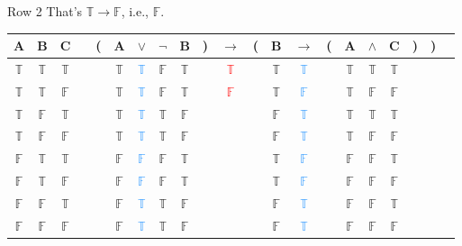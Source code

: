 \documentclass[
  ignorenonframetext,
]{beamer}
\renewcommand{\,}{\text{, }}
\def\True{\mathbb{T}}
\def\False{\mathbb{F}}
\begin{document}
\begin{frame}{Row 2}
\protect\hypertarget{row-2-1}{}
That's \(\True \rightarrow \False\), i.e., \(\False\).

\begin{center}

\begin{tabular}{@{ }c@{ }@{ }c@{ }@{ }c | c@{ }@{}c@{}@{ }c@{ }@{ }c@{ }@{ }c@{ }@{ }c@{ }@{}c@{}@{ }c@{ }@{}c@{}@{ }c@{ }@{ }c@{ }@{}c@{}@{ }c@{ }@{ }c@{ }@{ }c@{ }@{}c@{}@{}c@{}@{ }c}
A & B & C &  & ( & A & $\vee$ & $\neg$ & B & ) & $\rightarrow$ & ( & B & $\rightarrow$ & ( & A & $\wedge$ & C & ) & ) & \\
\hline 
 $\True$ & $\True$ & $\True$ &  &  & $\True$ & \textcolor{dodgerblue}{$\True$} & $\False$ & $\True$ &  &\textcolor{red}{$\True$}&  & $\True$ & \textcolor{dodgerblue}{$\True$} &  & $\True$ & $\True$ & $\True$ &  &  & \\
 $\True$ & $\True$ & $\False$ &  &  & $\True$ & \textcolor{dodgerblue}{$\True$} & $\False$ & $\True$ &  &\textcolor{red}{$\False$}&  & $\True$ & \textcolor{dodgerblue}{$\False$} &  & $\True$ & $\False$ & $\False$ &  &  & \\
 $\True$ & $\False$ & $\True$ &  &  & $\True$ & \textcolor{dodgerblue}{$\True$} & $\True$ & $\False$ &  &&  & $\False$ & \textcolor{dodgerblue}{$\True$} &  & $\True$ & $\True$ & $\True$ &  &  & \\
 $\True$ & $\False$ & $\False$ &  &  & $\True$ & \textcolor{dodgerblue}{$\True$} & $\True$ & $\False$ &  &&  & $\False$ & \textcolor{dodgerblue}{$\True$} &  & $\True$ & $\False$ & $\False$ &  &  & \\
 $\False$ & $\True$ & $\True$ &  &  & $\False$ & \textcolor{dodgerblue}{$\False$} & $\False$ & $\True$ &  &&  & $\True$ & \textcolor{dodgerblue}{$\False$} &  & $\False$ & $\False$ & $\True$ &  &  & \\
 $\False$ & $\True$ & $\False$ &  &  & $\False$ & \textcolor{dodgerblue}{$\False$} & $\False$ & $\True$ &  &&  & $\True$ & \textcolor{dodgerblue}{$\False$} &  & $\False$ & $\False$ & $\False$ &  &  & \\
 $\False$ & $\False$ & $\True$ &  &  & $\False$ & \textcolor{dodgerblue}{$\True$} & $\True$ & $\False$ &  &&  & $\False$ & \textcolor{dodgerblue}{$\True$} &  & $\False$ & $\False$ & $\True$ &  &  & \\
 $\False$ & $\False$ & $\False$ &  &  & $\False$ & \textcolor{dodgerblue}{$\True$} & $\True$ & $\False$ &  &&  & $\False$ & \textcolor{dodgerblue}{$\True$} &  & $\False$ & $\False$ & $\False$ &  &  & \\
\end{tabular}

\end{center}
\end{frame}
\end{document}

